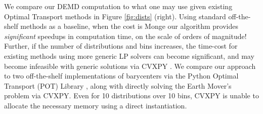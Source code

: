 We compare our DEMD computation 
to what one may use given existing Optimal Transport methods in Figure \ref{fig:dists} (right). Using standard off-the-shelf methods as a baseline, when the cost is Monge our algorithm provides \textit{significant} speedups in computation time, on the scale of orders of magnitude! Further, if the number of distributions and bins increases, the time-cost for existing methods using more generic LP solvers can become significant, and may become infeasible with generic solutions via CVXPY \citep{diamond2016cvxpy}. 
We compare our approach to two off-the-shelf implementations of barycenters via the Python Optimal Transport (POT) Library \citep{flamary2021pot}, along with 
directly solving the Earth Mover's problem via CVXPY. 
Even for 10 distributions over 10 bins, CVXPY is unable to allocate the necessary memory using a direct instantiation.






